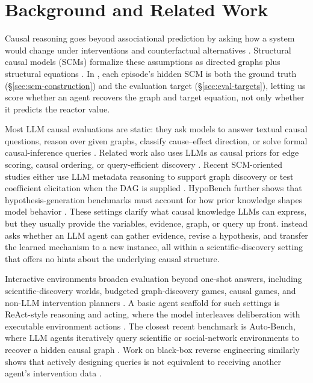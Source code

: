 \section{Background and Related Work}

Causal reasoning goes beyond associational prediction by asking how a system would change under interventions and counterfactual alternatives \citep{Pearl_2009,pearl2018why,imbens_rubin_causal_2015}. Structural causal models (SCMs) formalize these assumptions as directed graphs plus structural equations \citep{Pearl_2009}. In \projectname{}, each episode's hidden SCM is both the ground truth (\S\ref{sec:scm-construction}) and the evaluation target (\S\ref{sec:eval-targets}), letting us score whether an agent recovers the graph and target equation, not only whether it predicts the reactor value.

Most LLM causal evaluations are static: they ask models to answer textual causal questions, reason over given graphs, classify cause--effect direction, or solve formal causal-inference queries \citep{kiciman2023causal,jin2024cladderassessingcausalreasoning,corr2cause2024,clear2024,wang-2024-causalbench,chen2024causal}. Related work also uses LLMs as causal priors for edge scoring, causal ordering, or query-efficient discovery \citep{llmcausalgraphs2023,llmeffectivepriors2024,causalorder2023,efficientcausalgraph2024}. Recent SCM-oriented studies either use LLM metadata reasoning to support graph discovery \citep{abdulaal2024causalmodellingagents} or test coefficient elicitation when the DAG is supplied \citep{yamaoka2026linearllmscm}. HypoBench further shows that hypothesis-generation benchmarks must account for how prior knowledge shapes model behavior \citep{liu2025hypobench}. These settings clarify what causal knowledge LLMs can express, but they usually provide the variables, evidence, graph, or query up front. \projectname{} instead asks whether an LLM agent can gather evidence, revise a hypothesis, and transfer the learned mechanism to a new instance, all within a scientific-discovery setting that offers no hints about the underlying causal structure.

Interactive environments broaden evaluation beyond one-shot answers, including scientific-discovery worlds, budgeted graph-discovery games, causal games, and non-LLM intervention planners \citep{DBLP:journals/corr/abs-2406-06769,igda2025,chen2026causalgame,gregorini2025dodo}. A basic agent scaffold for such settings is ReAct-style reasoning and acting, where the model interleaves deliberation with executable environment actions \citep{DBLP:conf/iclr/YaoZYDSN023}. The closest recent benchmark is Auto-Bench, where LLM agents iteratively query scientific or social-network environments to recover a hidden causal graph \citep{chen2025autobench}. Work on black-box reverse engineering similarly shows that actively designing queries is not equivalent to receiving another agent's intervention data \citep{geng2025reliableaiscientists}.

